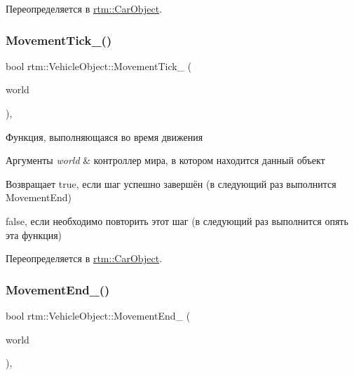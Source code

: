 Переопределяется в \hyperlink{classrtm_1_1_car_object_abbedfee1e8db8b12ea912d77efc4805c}{rtm\+::\+Car\+Object}.

\mbox{\label{classrtm_1_1_vehicle_object_a06a920b3fe0df4fa4ca0687a9366426a}} 
\subsubsection{\texorpdfstring{Movement\+Tick\+\_\+()}{MovementTick\_()}}
{\footnotesize\ttfamily bool rtm\+::\+Vehicle\+Object\+::\+Movement\+Tick\+\_\+ (\begin{DoxyParamCaption}\item[{\hyperlink{classrtm_1_1_world_controller}{World\+Controller} $\ast$const}]{world }\end{DoxyParamCaption})\hspace{0.3cm}{\ttfamily [protected]}, {\ttfamily [virtual]}}

Функция, выполняющаяся во время движения 
\begin{DoxyParams}{Аргументы}
{\em world} & контроллер мира, в котором находится данный объект \\
\hline
\end{DoxyParams}
\begin{DoxyReturn}{Возвращает}
true, если шаг успешно завершён (в следующий раз выполнится Movement\+End) 

false, если необходимо повторить этот шаг (в следующий раз выполнится опять эта функция) 
\end{DoxyReturn}


Переопределяется в \hyperlink{classrtm_1_1_car_object_abe89fea4893e244d9f6fb17c596b5ae0}{rtm\+::\+Car\+Object}.

\mbox{\label{classrtm_1_1_vehicle_object_a7e6c94902d1d544006ca8de63ba36860}} 
\subsubsection{\texorpdfstring{Movement\+End\+\_\+()}{MovementEnd\_()}}
{\footnotesize\ttfamily bool rtm\+::\+Vehicle\+Object\+::\+Movement\+End\+\_\+ (\begin{DoxyParamCaption}\item[{\hyperlink{classrtm_1_1_world_controller}{World\+Controller} $\ast$const}]{world }\end{DoxyParamCaption})\hspace{0.3cm}{\ttfamily [protected]}, {\ttfamily [virtual]}}

